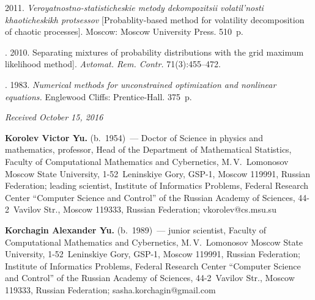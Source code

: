 \begin{multicols}{2}
{{\begin{thebibliography}{99}
     2011.
    \textit{Veroyatnostno-statisticheskie metody dekompozitsii volatil'nosti
        khaoticheskikh protsessov} [Probablity-based method for volatility
        decomposition of chaotic processes]. Moscow: Moscow University Press. 510~p.
    
   . 2010.
Separating mixtures of probability distributions with the 
grid maximum likelihood method].
    \textit{Avtomat. Rem. Contr.} 71(3):455--472.
    
    . 1983.
    \textit{Numerical methods for unconstrained optimization and nonlinear equations.} 
    Englewood Cliffs:     Prentice-Hall. 375~p.
    \end{thebibliography}

 }
 }

\end{multicols}

\vspace*{-3pt}

\hfill{\small\textit{Received October 15, 2016}}

\Contr


\noindent
\textbf{Korolev Victor Yu.} (b.\ 1954)~--- Doctor of Science in physics and mathematics, professor, 
Head of the Department of Mathematical Statistics, 
Faculty of Computational Mathematics and Cybernetics, 
M.\,V.~Lomonosov Moscow State University, 
1-52~Leninskiye Gory, GSP-1, Moscow 119991, Russian Federation; 
leading scientist, Institute of Informatics Problems, Federal Research Center 
``Computer Science and Control'' of the Russian Academy of Sciences, 44-2~Vavilov Str., 
Moscow 119333,  Russian Federation; \mbox{vkorolev@cs.msu.su} 

 \vspace*{3pt}

\noindent
\textbf{Korchagin Alexander Yu.} (b.\ 1989)~---
junior scientist, Faculty of Computational Mathematics and Cybernetics, 
M.\,V.~Lomonosov Moscow State University, 1-52~Leninskiye Gory, GSP-1, Moscow 119991, 
Russian Federation; Institute of Informatics Problems, Federal Research Center 
``Computer Science and Control'' of the Russian Academy of Sciences, 44-2~Vavilov Str., 
Moscow 119333, Russian Federation; \mbox{sasha.korchagin@gmail.com}

